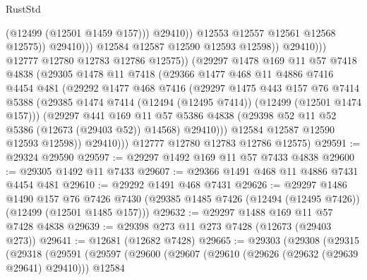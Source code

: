 \begin{lexlean}{RustStd}
\begin{coremodule}
                                        (@12499 (@12501 @1459 @157)))
                                      @29410))
                                  @12553
                                  @12557
                                  @12561
                                  @12568
                                  @12575))
                              @29410)))
                        @12584
                        @12587
                        @12590
                        @12593
                        @12598))
                    @29410)))
              @12777
              @12780
              @12783
              @12786
              @12575))
          (@29297
            @1478
            @169
            @11
            @57
            @7418
            @4838
            (@29305
              @1478
              @11
              @7418
              (@29366
                @1477
                @468
                @11
                @4886
                @7416
                @4454
                @481
                (@29292
                  @1477
                  @468
                  @7416
                  (@29297
                    @1475
                    @443
                    @157
                    @76
                    @7414
                    @5388
                    (@29385 @1474 @7414 (@12494 (@12495 @7414)) (@12499 (@12501 @1474 @157)))
                    (@29297
                      @441
                      @169
                      @11
                      @57
                      @5386
                      @4838
                      (@29398 @52 @11 @52 @5386 (@12673 (@29403 @52)) @14568)
                      @29410)))
                @12584
                @12587
                @12590
                @12593
                @12598))
            @29410)))
      @12777
      @12780
      @12783
      @12786
      @12575)
@29591 := @29324 @29590
@29597 := @29297 @1492 @169 @11 @57 @7433 @4838
@29600 := @29305 @1492 @11 @7433
@29607 := @29366 @1491 @468 @11 @4886 @7431 @4454 @481
@29610 := @29292 @1491 @468 @7431
@29626 := @29297
    @1486
    @1490
    @157
    @76
    @7426
    @7430
    (@29385 @1485 @7426 (@12494 (@12495 @7426)) (@12499 (@12501 @1485 @157)))
@29632 := @29297 @1488 @169 @11 @57 @7428 @4838
@29639 := @29398 @273 @11 @273 @7428 (@12673 (@29403 @273))
@29641 := @12681 (@12682 @7428)
@29665 := @29303
    (@29308
      (@29315
        (@29318
          (@29591
            (@29597
              (@29600
                (@29607
                  (@29610 (@29626 (@29632 (@29639 @29641) @29410)))
                  @12584

\end{coremodule}
\end{lexlean}
